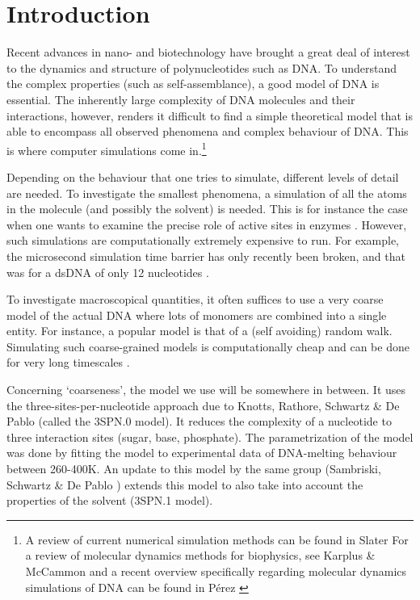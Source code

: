 \section{Introduction}


Recent advances in nano- and biotechnology have brought a great deal of interest to the dynamics and structure of polynucleotides such as DNA. To understand the complex properties (such as self-assemblance), a good model of DNA is essential. The inherently large complexity of DNA molecules and their interactions, however, renders it difficult to find a simple theoretical model that is able to encompass all observed phenomena and complex behaviour of DNA. This is where computer simulations come in.\footnote{A review of current numerical simulation methods can be found in Slater \etal \cite{slater2009modeling} For a review of molecular dynamics methods for biophysics, see Karplus \& McCammon \cite{karplus2002molecular} and a recent overview specifically regarding molecular dynamics simulations of DNA can be found in P\'erez \etal\cite{perez2011frontiers}}

Depending on the behaviour that one tries to simulate, different levels of detail are needed. To investigate the smallest phenomena, a simulation of all the atoms in the molecule (and possibly the solvent) is needed. This is for instance the case when one wants to examine the precise role of active sites in enzymes \cite{weiner1986all}.  However, such simulations are computationally extremely expensive to run. For example, the microsecond simulation time barrier has only recently been broken, and that was for a dsDNA of only 12 nucleotides \cite{perez2007dynamics}.

To investigate macroscopical quantities, it often suffices to use a very coarse model of the actual DNA where lots of monomers are combined into a single entity. For instance, a popular model is that of a (self avoiding) random walk. Simulating such coarse-grained models is computationally cheap and can be done for very long timescales \cite{elber2005long}.

Concerning `coarseness', the model we use will be somewhere in between. It uses the three-sites-per-nucleotide approach due to Knotts, Rathore, Schwartz \& De Pablo \cite{knotts2007coarse} (called the 3SPN.0 model). It reduces the complexity of a nucleotide to three interaction sites (sugar, base, phosphate). The parametrization of the model was done by fitting the model to experimental data of DNA-melting behaviour between 260-400K. An update to this model by the same group (Sambriski, Schwartz \& De Pablo \cite{sambriski2009mesoscale}) extends this model to also take into account the properties of the solvent (3SPN.1 model).

